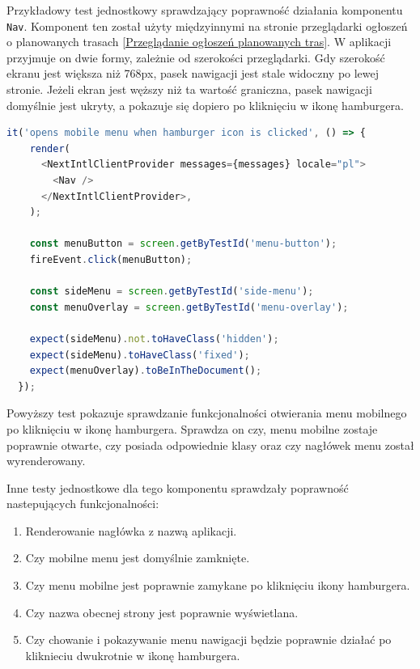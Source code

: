 Przykładowy test jednostkowy sprawdzający poprawność działania komponentu \texttt{Nav}. Komponent ten został użyty międzyinnymi na stronie przeglądarki ogłoszeń o planowanych trasach \ref{Przeglądanie ogłoszeń planowanych tras}. W aplikacji przyjmuje on dwie formy, zależnie od szerokości przeglądarki. Gdy szerokość ekranu jest większa niż 768px, pasek nawigacji jest stale widoczny po lewej stronie. Jeżeli ekran jest węższy niż ta wartość graniczna, pasek nawigacji domyślnie jest ukryty, a pokazuje się dopiero po kliknięciu w ikonę hamburgera.

{\belowcaptionskip=-9pt
\begin{lstlisting}[language=JavaScript,caption=Przykładowy test jednostkowy paska nawigacyjnego, label=lst:NavTest]
it('opens mobile menu when hamburger icon is clicked', () => {
    render(
      <NextIntlClientProvider messages={messages} locale="pl">
        <Nav />
      </NextIntlClientProvider>,
    );

    const menuButton = screen.getByTestId('menu-button');
    fireEvent.click(menuButton);

    const sideMenu = screen.getByTestId('side-menu');
    const menuOverlay = screen.getByTestId('menu-overlay');

    expect(sideMenu).not.toHaveClass('hidden');
    expect(sideMenu).toHaveClass('fixed');
    expect(menuOverlay).toBeInTheDocument();
  });
\end{lstlisting}
}

Powyższy test pokazuje sprawdzanie funkcjonalności otwierania menu mobilnego po kliknięciu w ikonę hamburgera. Sprawdza on czy, menu mobilne zostaje poprawnie otwarte, czy posiada odpowiednie klasy oraz czy nagłówek menu został wyrenderowany.

Inne testy jednostkowe dla tego komponentu sprawdzały poprawność nastepujących funkcjonalności:
\begin{enumerate}
  \item Renderowanie nagłówka z nazwą aplikacji.
  \item Czy mobilne menu jest domyślnie zamknięte.
  \item Czy menu mobilne jest poprawnie zamykane po kliknięciu ikony hamburgera.
  \item Czy nazwa obecnej strony jest poprawnie wyświetlana.
  \item Czy chowanie i pokazywanie menu nawigacji będzie poprawnie działać po kliknieciu dwukrotnie w ikonę hamburgera.
\end{enumerate}

